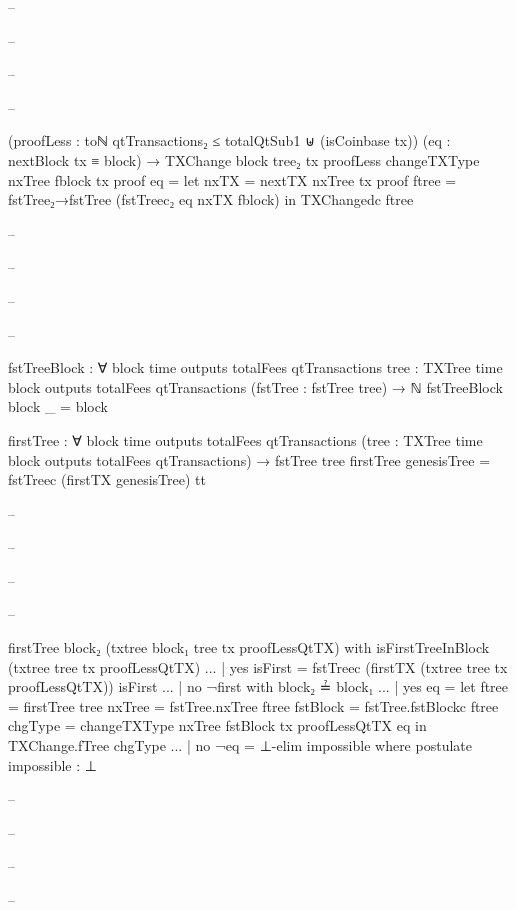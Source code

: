 \documentclass{beamer}
\begin{document}
{\begin{frame}
\begin{code}
-- \end{code}
-- \end{frame}
-- \begin{frame}
-- \begin{code}

        (proofLess :
          toℕ qtTransactions₂ ≤ totalQtSub1
          ⊎
          (isCoinbase tx))
        (eq : nextBlock tx ≡ block)
        → TXChange {block} tree₂ tx proofLess
      changeTXType nxTree fblock tx proof eq =
        let nxTX = nextTX nxTree tx proof
            ftree = fstTree₂→fstTree (fstTreec₂ eq nxTX fblock)
        in TXChangedc ftree

-- \end{code}
-- \end{frame}
-- \begin{frame}
-- \begin{code}


      fstTreeBlock : ∀
        {block time outputs totalFees qtTransactions}
        {tree : TXTree time block outputs totalFees qtTransactions}
        (fstTree : fstTree tree)
        → ℕ
      fstTreeBlock {block} _ = block

      firstTree : ∀
        {block time outputs totalFees qtTransactions}
        (tree : TXTree time block outputs totalFees qtTransactions)
        → fstTree tree
      firstTree genesisTree = fstTreec (firstTX genesisTree) tt

-- \end{code}
-- \end{frame}
-- \begin{frame}
-- \begin{code}

      firstTree {block₂} (txtree {block₁} tree tx proofLessQtTX)
        with isFirstTreeInBlock (txtree tree tx proofLessQtTX)
      ... | yes isFirst = fstTreec
        (firstTX (txtree tree tx proofLessQtTX)) isFirst
      ... | no ¬first with block₂ ≟ block₁
      ...   | yes eq = let ftree = firstTree tree
                           nxTree = fstTree.nxTree ftree
                           fstBlock = fstTree.fstBlockc ftree
                           chgType = changeTXType nxTree
                             fstBlock tx proofLessQtTX eq
                       in TXChange.fTree chgType
      ...   | no ¬eq = ⊥-elim impossible
                where postulate impossible : ⊥

-- \end{code}
-- \end{frame}
-- \begin{frame}
-- \begin{code}


\end{code}
\end{frame}}
\end{document}
